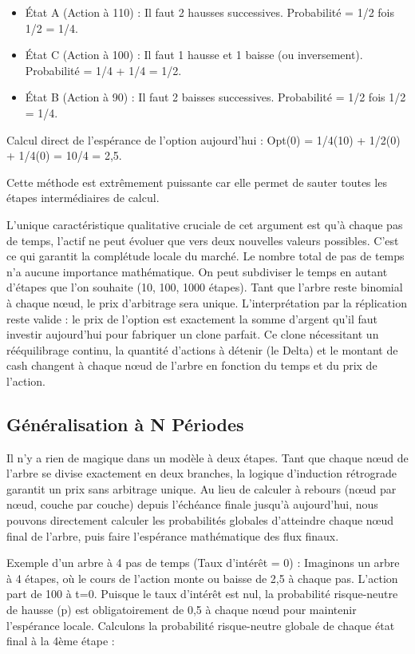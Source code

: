 \begin{itemize}[label=$\cdot$]
    \item État A (Action à 110) : Il faut 2 hausses successives. Probabilité = 1/2 fois 1/2 = 1/4.
    \item État C (Action à 100) : Il faut 1 hausse et 1 baisse (ou inversement). Probabilité = 1/4 + 1/4 = 1/2.
    \item État B (Action à 90) : Il faut 2 baisses successives. Probabilité = 1/2 fois 1/2 = 1/4.
\end{itemize}

Calcul direct de l'espérance de l'option aujourd'hui :
Opt(0) = 1/4(10) + 1/2(0) + 1/4(0) = 10/4 = 2,5.

Cette méthode est extrêmement puissante car elle permet de sauter toutes les étapes intermédiaires de calcul.

L'unique caractéristique qualitative cruciale de cet argument est qu'à chaque pas de temps, l'actif ne peut évoluer que vers deux nouvelles valeurs possibles. C'est ce qui garantit la complétude locale du marché. Le nombre total de pas de temps n'a aucune importance mathématique. On peut subdiviser le temps en autant d'étapes que l'on souhaite (10, 100, 1000 étapes). Tant que l'arbre reste binomial à chaque nœud, le prix d'arbitrage sera unique. L'interprétation par la réplication reste valide : le prix de l'option est exactement la somme d'argent qu'il faut investir aujourd'hui pour fabriquer un clone parfait. Ce clone nécessitant un rééquilibrage continu, la quantité d'actions à détenir (le Delta) et le montant de cash changent à chaque nœud de l'arbre en fonction du temps et du prix de l'action.

\subsection{Généralisation à N Périodes}

Il n'y a rien de magique dans un modèle à deux étapes. Tant que chaque nœud de l'arbre se divise exactement en deux branches, la logique d'induction rétrograde garantit un prix sans arbitrage unique. Au lieu de calculer à rebours (nœud par nœud, couche par couche) depuis l'échéance finale jusqu'à aujourd'hui, nous pouvons directement calculer les probabilités globales d'atteindre chaque nœud final de l'arbre, puis faire l'espérance mathématique des flux finaux.

Exemple d'un arbre à 4 pas de temps (Taux d'intérêt = 0) :
Imaginons un arbre à 4 étapes, où le cours de l'action monte ou baisse de 2,5 à chaque pas. L'action part de 100 à t=0. 
Puisque le taux d'intérêt est nul, la probabilité risque-neutre de hausse (p) est obligatoirement de 0,5 à chaque nœud pour maintenir l'espérance locale.
Calculons la probabilité risque-neutre globale de chaque état final à la 4ème étape :

